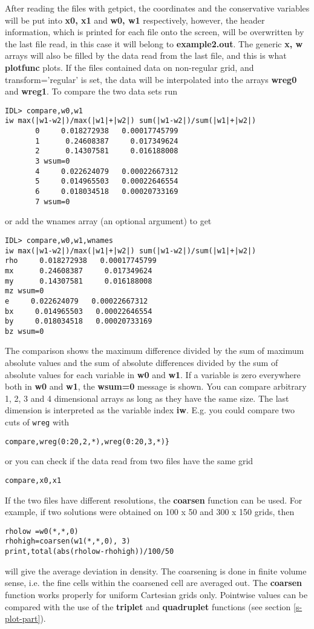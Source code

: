    After reading the files with getpict, 
   the coordinates and the conservative variables 
   will be put into {\bf x0, x1} and {\bf w0, w1} respectively, however, 
   the header information, which is printed for each file onto the screen, 
   will be overwritten by the last file read, in this case it will belong to
   {\bf example2.out}. The generic {\bf x, w} arrays will also be
   filled by the data read from the last file, and this is what 
   {\bf plotfunc} plots. If the files contained data on non-regular grid,
   and transform='regular' is set, the data will be interpolated into 
   the arrays {\bf wreg0} and {\bf wreg1}. 
   To compare the two data sets run
\begin{verbatim}
IDL> compare,w0,w1
iw max(|w1-w2|)/max(|w1|+|w2|) sum(|w1-w2|)/sum(|w1|+|w2|)
       0     0.018272938   0.00017745799
       1      0.24608387     0.017349624
       2      0.14307581     0.016188008
       3 wsum=0
       4     0.022624079   0.00022667312
       5     0.014965503   0.00022646554
       6     0.018034518   0.00020733169
       7 wsum=0
\end{verbatim}
or add the wnames array (an optional argument) to get
\begin{verbatim}
IDL> compare,w0,w1,wnames
iw max(|w1-w2|)/max(|w1|+|w2|) sum(|w1-w2|)/sum(|w1|+|w2|)
rho     0.018272938   0.00017745799
mx      0.24608387     0.017349624
my      0.14307581     0.016188008
mz wsum=0
e     0.022624079   0.00022667312
bx     0.014965503   0.00022646554
by     0.018034518   0.00020733169
bz wsum=0
\end{verbatim}
   The comparison shows the maximum difference divided by the sum of maximum 
   absolute
   values and the sum of absolute differences divided by the sum of absolute
   values for each variable in {\bf w0} and {\bf w1}. If a variable is zero
   everywhere both in {\bf w0} and {\bf w1}, the {\bf wsum=0} message is shown.
   You can compare arbitrary 1, 2, 3 and 4 dimensional arrays as long as they 
   have the same size.
   The last dimension is interpreted as the variable index {\bf iw}.
   E.g. you could compare two cuts of {\tt wreg} with
\begin{verbatim}
compare,wreg(0:20,2,*),wreg(0:20,3,*)}
\end{verbatim}
   or you can check if the data read from two files have the same grid
\begin{verbatim}
compare,x0,x1
\end{verbatim}
   If the two files have different resolutions, the {\bf coarsen} 
   function can be used. For example, if two solutions were obtained on 
   100 x 50 and 300 x 150 grids, then 
\begin{verbatim}
rholow =w0(*,*,0)
rhohigh=coarsen(w1(*,*,0), 3)
print,total(abs(rholow-rhohigh))/100/50
\end{verbatim}
will give the average deviation in density. The coarsening is done in
finite volume sense, i.e. the fine cells within the coarsened cell are
averaged out. The {\bf coarsen} function works properly for
uniform Cartesian grids only. Pointwise values can be compared
with the use of the {\bf triplet} and {\bf quadruplet} functions 
(see section \ref{s-plot-part}).

